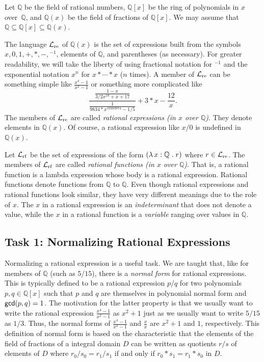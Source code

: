 \documentclass[fleqn]{llncs}
\newcommand{\QQ}{\ensuremath{\mathbb{Q}}}
\newcommand{\funQ}[1]{\ensuremath{\LambdaApp x : \QQ \mdot #1}}
\newcommand{\Langre}{\ensuremath{\mathcal{L}}_{\rm re}}
\newcommand{\Langrf}{\ensuremath{\mathcal{L}}_{\rm rf}}
\begin{document}
Let $\QQ$ be the field of rational numbers, $\QQ[x]$ be the ring of
polynomials in $x$ over~$\QQ$, and $\QQ(x)$ be the field of fractions
of $\QQ[x]$.  We may assume that \mbox{$\QQ \subseteq \QQ[x] \subseteq
\QQ(x)$}.  

The language $\Langre$ of $\QQ(x)$ is the set of expressions built from
the symbols $x, 0, 1, +, *, -, \phantom{}^{-1}$, elements of $\QQ$,
and parentheses (as necessary).  For greater readability, we will take
the liberty of using fractional notation for $\phantom{}^{-1}$ and the
exponential notation $x^n$ for $x * \cdots * x$ ($n$ times).  A member
of $\Langre$ can be something simple like $\frac{x^4-1}{x^2-1}$ or
something more complicated like
\begin{equation*}
\frac{\frac{1-x}{3/2 x^{18} + x + 17}}
     {\frac{1}{9834*x^{19393874}-1/5}}+3*x -\frac{12}{x}.
\end{equation*}
The members of $\Langre$ are called \emph{rational expressions (in $x$
  over $\QQ$)}.  They denote elements in $\QQ(x)$.  Of course, a
rational expression like $x/0$ is undefined in $\QQ(x)$.

Let $\Langrf$ be the set of expressions of the form $(\funQ{r})$ where
$r \in \Langre$.  The members of $\Langrf$ are called \emph{rational
  functions (in $x$ over $\QQ$)}.  That is, a rational function is a
lambda expression whose body is a rational expression.  Rational
functions denote functions from $\QQ$ to $\QQ$.  Even though rational
expressions and rational functions look similar, they have very
different meanings due to the role of $x$.  The $x$ in a rational
expression is an \emph{indeterminant} that does not denote a value,
while the $x$ in a rational function is a \emph{variable} ranging over
values in $\QQ$.

\subsection{Task 1: Normalizing Rational Expressions}

Normalizing a rational expression is a useful task.  We are taught
that, like for members of $\QQ$ (such as $5/15$), there is a
\emph{normal form} for rational expressions. This is typically defined
to be a rational expression $p/q$ for two polynomials $p,q \in \QQ[x]$
such that $p$ and $q$ are themselves in polynomial normal form and
$\mbox{\sf gcd}(p,q) = 1$.  The motivation for the latter property is
that we usually want to write the rational expression
$\frac{x^4-1}{x^2-1}$ as $x^2 + 1$ just as we usually want to write
$5/15$ as $1/3$.  Thus, the normal forms of $\frac{x^4-1}{x^2-1}$ and
$\frac{x}{x}$ are $x^2 + 1$ and $1$, respectively.  This definition of
normal form is based on the characteristic that the elements of the
field of fractions of a integral domain $D$ can be written as
quotients $r/s$ of elements of $D$ where $r_0/s_0 = r_1/s_1$ if and
only if $r_0 * s_1 = r_1 * s_0$ in $D$.
\end{document}
